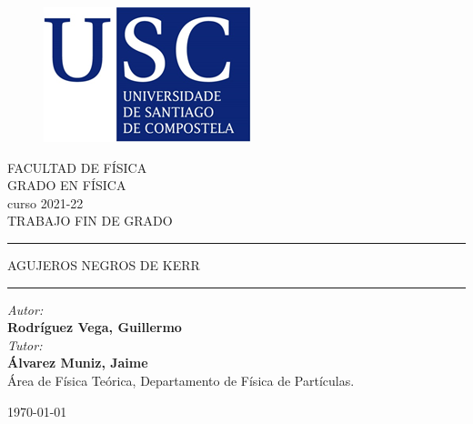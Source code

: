 \documentclass{article}
\begin{document}
\begin{titlepage}
\begin{minipage}{\linewidth}
      \centering
      \begin{minipage}{0.45\linewidth}
          \begin{figure}[H]
              \includegraphics[width=0.9\linewidth]{USC.png}
              
          \end{figure}
      \end{minipage}
      \hspace{0.05\linewidth}
      \begin{minipage}{0.45\linewidth}
          \begin{flushright}
            \large
            \color{Blue}
            FACULTAD DE FÍSICA\\GRADO EN FÍSICA\\curso 2021-22\\TRABAJO FIN DE GRADO
        \end{flushright}
      \end{minipage}
  \end{minipage}

\vspace{4cm}
\hrule
\vspace{1cm}

\centering
{\Huge AGUJEROS NEGROS DE KERR}
\vspace{2cm}
\hrule
\vspace{8cm}
\begin{flushleft}
\textit{Autor:}\\
\textbf{Rodríguez Vega, Guillermo}\\
\vspace{0.5cm}
\textit{Tutor:}\\
\textbf{Álvarez Muniz, Jaime}\\ 
Área de Física Teórica, Departamento de Física de Partículas.
\end{flushleft}
\begin{flushright}
\monthyeardate\today
\end{flushright}
\end{titlepage}
\end{document}
